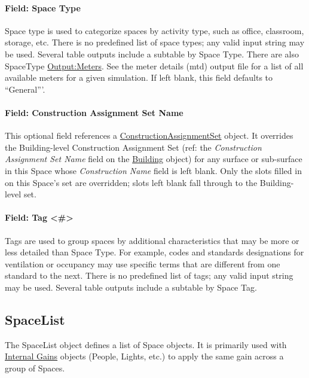 \paragraph{Field: Space Type}\label{space-type}

Space type is used to categorize spaces by activity type, such as office, classroom, storage, etc. There is no predefined list of space types;
any valid input string may be used. Several table outputs include a subtable by Space Type. There are also SpaceType \hyperref[outputmeter-and-outputmetermeterfileonly]{Output:Meters}. See the meter details (mtd) output file for a list of all available meters for a given simulation.
If left blank, this field defaults to ``General'''.

\paragraph{Field: Construction Assignment Set Name}\label{space-field-construction-assignment-set-name}

This optional field references a \hyperref[constructionassignmentset]{ConstructionAssignmentSet} object. It overrides the Building-level Construction Assignment Set (ref: the \emph{Construction Assignment Set Name} field on the \hyperref[building]{Building} object) for any surface or sub-surface in this Space whose \emph{Construction Name} field is left blank. Only the slots filled in on this Space's set are overridden; slots left blank fall through to the Building-level set.

\paragraph{Field: Tag \textless{}\#\textgreater{}}\label{field-space-tag}

Tags are used to group spaces by additional characteristics that may be more or less detailed than Space Type. For example, codes and standards designations for ventilation or occupancy may use specific terms that are different from one standard to the next. There is no predefined list of tags;
any valid input string may be used. Several table outputs include a subtable by Space Tag.


\subsection{SpaceList}\label{spacelist}

The SpaceList object defines a list of Space objects. It is primarily used with \hyperref[group-internal-gains-people-lights-other]{Internal Gains} objects (People, Lights, etc.) to apply the same gain across a group of Spaces.

